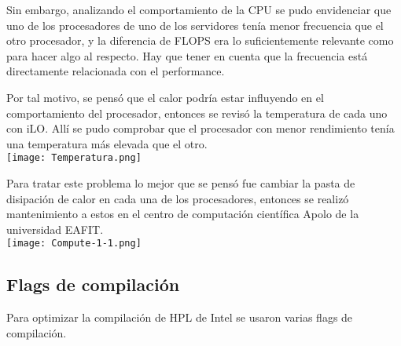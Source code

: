 Sin embargo, analizando el comportamiento de la CPU se pudo envidenciar que uno de los procesadores de uno de los servidores tenía menor frecuencia que el otro procesador, y la diferencia de FLOPS era lo suficientemente relevante como para hacer algo al respecto. Hay que tener en cuenta que la frecuencia está directamente relacionada con el performance.

Por tal motivo, se pensó que el calor podría estar influyendo en el comportamiento del procesador, entonces se revisó la temperatura de cada uno con iLO. Allí se pudo comprobar que el procesador con menor rendimiento tenía una temperatura más elevada que el otro.\\

\texttt{[image: Temperatura.png]}

Para tratar este problema lo mejor que se pensó fue cambiar la pasta de disipación de calor en cada una de los procesadores, entonces se realizó mantenimiento a estos en el centro de computación científica Apolo de la universidad EAFIT.\\


\texttt{[image: Compute-1-1.png]}

\subsection{Flags de compilación}
Para optimizar la compilación de HPL de Intel se usaron varias flags de compilación.


